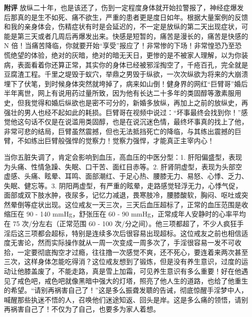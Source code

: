 \begin{case}
    \textbf{附评} 放纵二十年，也是该还了，伤到一定程度身体就开始拉警报了，神经症爆发后那真的是生不如死、痛不欲生，严重的患者更是度日如年。根据大量案例的反馈和我的亲身体会，伤精症状有时是会延迟的，不一定是放纵的第二天出现症状，可能是第三天或者几周后再爆发出来。快感是短暂的，痛苦是漫长的，痛苦是快感的 N 倍！当痛苦降临，你就要开始“享受”报应了！非常惨的下场！非常惶恐乃至恐慌绝望的体验，绝对的灰暗，绝对的暗无天日，更惨的是不被家人理解，以为你装病，表面看着你还算正常，其实你的身体已经被邪淫掏空了，千疮百孔，完全就是豆腐渣工程。千里之堤毁于蚁穴，举鼎之男毁于纵欲，一次次纵欲为将来的大崩溃埋下了伏笔，到时候身体突然就垮掉了，病来如山倒！健身界的网红“巨臂哥”婚后半年离世，网上有说用药过量所致，因为他有长达二十多年的类固醇等激素服用史，但我觉得和婚后纵欲也是密不可分的，新婚多放纵，再加上之前的放纵史，再强壮的男人也经不起如此的耗损。巨臂哥在视频中说过：“坏事最终会找到你！”感觉他这句话不仅是在说滥用类固醇，也是在说沉迷色情，最终坏事真的找上了他，非常可悲的结局，巨臂虽然震撼，但也无法抵挡死亡的降临，与其练出震撼的巨臂，不如练出巨臂般强悍的觉察力！觉察力强悍，才能真正主宰内心！

    当你五脏失调了，肯定会影响到血压，高血压的中医分型：1. 肝阳偏盛型，表现为头痛、性情急躁、失眠、口干苦、面红目赤等。2. 肝肾阴虚型，表现为头部空虚感、头痛、眩晕、耳鸣、面部潮红、于足心热、腰膝无力、易怒、心悸、乏力、失眠、健忘等。3. 阴阳两虚型，有严重的眩晕，走路感觉轻浮无力，心悸气促，面部或双下肢水肿，夜尿多，记忆力减退，畏寒肢冷，腰膝酸软，胸闷、呕吐或突然晕倒等症状出现。这位戒友一天三次，三天后血压超标了，正常的血压范围是收缩压在 90 - 140 \unit{\mmHg}，舒张压在 60 - 90 \unit{\mmHg}，正常成年人安静时的心率平均在 75 次/分左右（正常范围 60 - 100 次/分之间）。他三项都超了，不少人疯狂手淫后这三项都会超标，特别是连续多次后很容易出现超标。这位戒友之前也相信适度无害论，然而实际操作就从一周一次变成一周多次了，手淫很容易一发不可收拾，一定要彻底掏空才过瘾，往往撸一次感觉不爽，还不死心，要连着来两次甚至三次，这样身体怎能吃得消？这位戒友想到了锻炼，但是没有养生意识，过度的运动让他膝盖废了，不能走路，真是雪上加霜，可见养生意识有多么重要！好在他遇见了戒色吧，戒色吧就像黑暗中强大的灯塔，照亮了他人生的道路，也给了他重生的希望。“请别再祸害自己了！”这是多么振聋发聩的告诫，彻底惊醒手淫梦中人，喊醒那些执迷不悟的人，召唤他们迷途知返、回头是岸。这是多么痛的领悟，请别再祸害自己了！不仅为了自己，也要多为家人着想。
\end{case}

